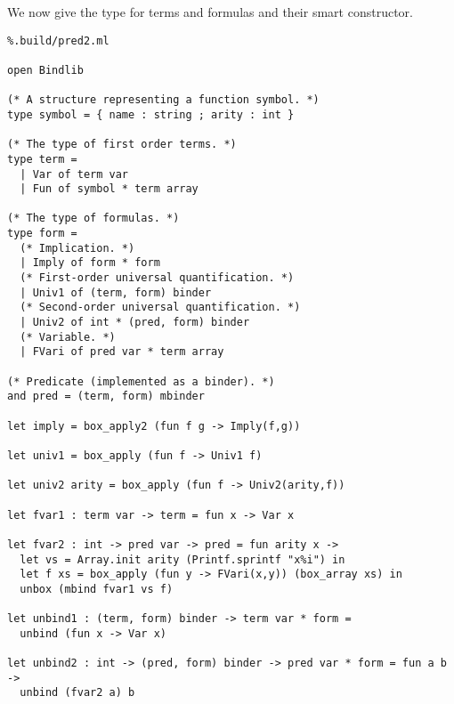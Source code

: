 \documentclass[11pt]{article}
\begin{document}
We now give the type for terms and formulas and their smart constructor.
\begin{lstlisting}%.build/pred2.ml

open Bindlib

(* A structure representing a function symbol. *)
type symbol = { name : string ; arity : int }

(* The type of first order terms. *)
type term =
  | Var of term var
  | Fun of symbol * term array

(* The type of formulas. *)
type form =
  (* Implication. *)
  | Imply of form * form
  (* First-order universal quantification. *)
  | Univ1 of (term, form) binder
  (* Second-order universal quantification. *)
  | Univ2 of int * (pred, form) binder
  (* Variable. *)
  | FVari of pred var * term array

(* Predicate (implemented as a binder). *)
and pred = (term, form) mbinder

let imply = box_apply2 (fun f g -> Imply(f,g))

let univ1 = box_apply (fun f -> Univ1 f)

let univ2 arity = box_apply (fun f -> Univ2(arity,f))

let fvar1 : term var -> term = fun x -> Var x

let fvar2 : int -> pred var -> pred = fun arity x ->
  let vs = Array.init arity (Printf.sprintf "x%i") in
  let f xs = box_apply (fun y -> FVari(x,y)) (box_array xs) in
  unbox (mbind fvar1 vs f)

let unbind1 : (term, form) binder -> term var * form =
  unbind (fun x -> Var x)

let unbind2 : int -> (pred, form) binder -> pred var * form = fun a b ->
  unbind (fvar2 a) b
\end{lstlisting}
\end{document}
